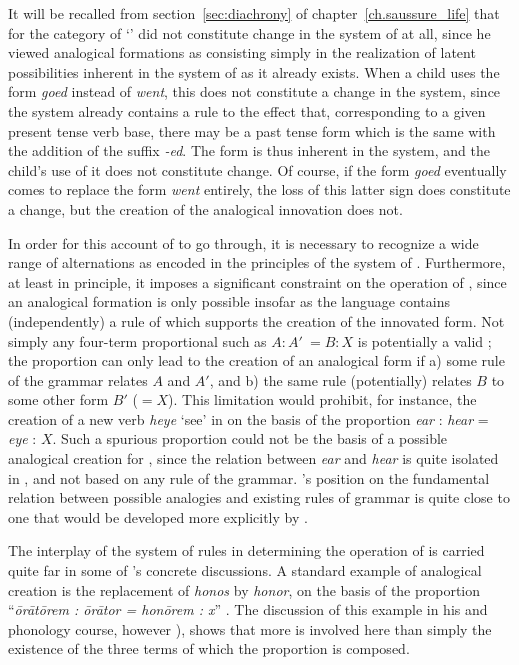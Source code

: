 It will be recalled from section~\ref{sec:diachrony} of
chapter~\ref{ch.saussure_life} that for {\Saussure} the category of
`' did not constitute change in the system of
\emph{} at all, since he viewed analogical formations as
consisting simply in the realization of latent possibilities inherent
in the system of \emph{} as it already exists. When a child uses
the form \emph{goed} instead of \emph{went}, this does not constitute
a change in the system, since the system already contains a rule to
the effect that, corresponding to a given present tense verb base,
there may be a past tense form which is the same with the addition of
the suffix \emph{-ed}. The form is thus inherent in the system, and
the child's use of it does not constitute change. Of course, if the
form \emph{goed} eventually comes to replace the form \emph{went}
entirely, the loss of this latter sign does constitute a change, but
the creation of the analogical innovation does not.

In order for this account of  to go through, it is necessary to
recognize a wide range of alternations as encoded in the principles of
the system of \emph{}. Furthermore, at least in principle, it
imposes a significant constraint on the operation of , since an
analogical formation is only possible insofar as the language contains
(independently) a rule of  which supports the creation of
the innovated form. Not simply any four-term proportional such as
$A : A\prime\ = B : X$ is potentially a valid ; the proportion
can only lead to the creation of an analogical form if a) some rule of
the grammar relates $A$ and $A\prime$, and b) the same rule
(potentially) relates $B$ to some other form $B\prime$ ($=X$). This
limitation would prohibit, for instance, the creation of a new verb
\emph{heye} `see' in  on the basis of the proportion \emph{ear}
: \emph{hear} = \emph{eye} : $X$. Such a spurious proportion could not
be the basis of a possible analogical creation for {\Saussure}, since the
relation between \emph{ear} and \emph{hear} is quite isolated in
, and not based on any rule of the grammar. {\Saussure}'s position
on the fundamental relation between possible analogies and existing
rules of grammar is quite close to one that would be developed more
explicitly by \citet{kurylowicz:laws,kurylowicz:ieinflection}.

The interplay of the system of rules in determining the operation of
 is carried quite far in some of {\Saussure}'s concrete
discussions. A standard example of analogical creation is the
replacement of  \emph{honos} by \emph{honor}, on the basis of the
proportion ``\emph{ōrātōrem : ōrātor = honōrem : x}''
\citep[226]{saussure16:cours-original}. The discussion of this example
in his  and  phonology course, however
\citep{reichler-beguelin80:saussure-grec-et-latin}), shows that more
is involved here than simply the existence of the three terms of which
the proportion is composed.

